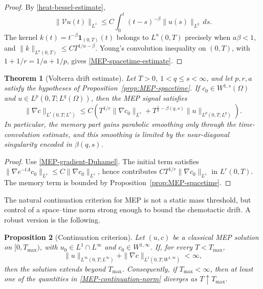 \documentclass[pdflatex,sn-mathphys-num]{sn-jnl}%
\theoremstyle{thmstyleone}
\newtheorem{theorem}{Theorem}
\newtheorem{proposition}[theorem]{Proposition}%
\theoremstyle{thmstyletwo}
\theoremstyle{thmstylethree}
\begin{document}
\begin{proof}
By \eqref{heat-bessel-estimate},
\[
        \|\mathcal V u(t)\|_{L^s}
        \le
        C\int_0^t(t-s)^{-\beta}\|u(s)\|_{L^q}\,ds.
\]
The kernel \(k(t)=t^{-\beta}\mathbf 1_{(0,T)}(t)\) belongs to \(L^a(0,T)\)
precisely when \(a\beta<1\), and
\(\|k\|_{L^a(0,T)}\le C T^{1/a-\beta}\).  Young's convolution inequality on
\((0,T)\), with \(1+1/r=1/a+1/p\), gives \eqref{MEP-spacetime-estimate}.
\end{proof}

\begin{theorem}[Volterra drift estimate]
\label{thm:MEP-volterra-drift}
Let \(T>0\), \(1<q\le s<\infty\), and let \(p,r,a\) satisfy the hypotheses of
Proposition~\ref{prop:MEP-spacetime}.  If \(c_0\in W^{1,s}(\Omega)\) and
\(u\in L^p(0,T;L^q(\Omega))\), then the MEP signal satisfies
\begin{equation}
        \|\nabla c\|_{L^r(0,T;L^s)}
        \le
        C\left(
        T^{1/r}\|\nabla c_0\|_{L^s}
        +
        T^{\frac1a-\beta(q,s)}
        \|u\|_{L^p(0,T;L^q)}
        \right).
\label{MEP-main-volterra-estimate}
\end{equation}
In particular, the memory part gains parabolic smoothing only through the
time-convolution estimate, and this smoothing is limited by the
near-diagonal singularity encoded in \(\beta(q,s)\).
\end{theorem}

\begin{proof}
Use \eqref{MEP-gradient-Duhamel}.  The initial term satisfies
\(\|\nabla e^{-tA}c_0\|_{L^s}\le C\|\nabla c_0\|_{L^s}\), hence contributes
\(C T^{1/r}\|\nabla c_0\|_{L^s}\) in \(L^r(0,T)\).  The memory term is bounded
by Proposition~\ref{prop:MEP-spacetime}.
\end{proof}


The natural continuation criterion for MEP is not a static mass threshold, but
control of a space--time norm strong enough to bound the chemotactic drift.  A
robust version is the following.

\begin{proposition}[Continuation criterion]
\label{prop:MEP-continuation}
Let \((u,c)\) be a classical MEP solution on \([0,T_{\max})\), with
\(u_0\in L^1\cap L^\infty\) and \(c_0\in W^{1,\infty}\).  If, for every
\(T<T_{\max}\),
\begin{equation}
        \|u\|_{L^\infty(0,T;L^\infty)}
        +
        \|\nabla c\|_{L^1(0,T;W^{1,\infty})}
        <\infty,
\label{MEP-continuation-norm}
\end{equation}
then the solution extends beyond \(T_{\max}\).  Consequently, if
\(T_{\max}<\infty\), then at least one of the quantities in
\eqref{MEP-continuation-norm} diverges as \(T\uparrow T_{\max}\).
\end{proposition}
\end{document}
